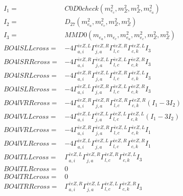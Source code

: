 \documentclass[A4,landscape]{article}
\begin{document}
\begin{align} 
I_1 = & C0D0check(m^2_{e_{{c}}}, m^2_{Z}, m^2_{Z}, m^2_{e_{{a}}}) \\ 
I_2 = & D_{27}(m^2_{e_{{a}}}, m^2_{e_{{c}}}, m^2_{Z}, m^2_{Z}) \\ 
I_3 = & MMD0(m_{e_{{a}}}, m_{e_{{c}}}, m^2_{e_{{a}}}, m^2_{e_{{c}}}, m^2_{Z}, m^2_{Z}) \\ 
  BO4lSLLcross= & -4  \Gamma^{\bar{e}e Z ,L}_{a, i} \Gamma^{\bar{e}e Z ,R}_{j, a} \Gamma^{\bar{e}e Z ,R}_{l, c} \Gamma^{\bar{e}e Z ,L}_{c, k} I_3 \\ 
  BO4lSRRcross= & -4  \Gamma^{\bar{e}e Z ,R}_{a, i} \Gamma^{\bar{e}e Z ,L}_{j, a} \Gamma^{\bar{e}e Z ,L}_{l, c} \Gamma^{\bar{e}e Z ,R}_{c, k} I_3 \\ 
  BO4lSRLcross= & -4  \Gamma^{\bar{e}e Z ,R}_{a, i} \Gamma^{\bar{e}e Z ,L}_{j, a} \Gamma^{\bar{e}e Z ,R}_{l, c} \Gamma^{\bar{e}e Z ,L}_{c, k} I_3 \\ 
  BO4lSLRcross= & -4  \Gamma^{\bar{e}e Z ,L}_{a, i} \Gamma^{\bar{e}e Z ,R}_{j, a} \Gamma^{\bar{e}e Z ,L}_{l, c} \Gamma^{\bar{e}e Z ,R}_{c, k} I_3 \\ 
  BO4lVRRcross= & -4  \Gamma^{\bar{e}e Z ,R}_{a, i} \Gamma^{\bar{e}e Z ,R}_{j, a} \Gamma^{\bar{e}e Z ,R}_{l, c} \Gamma^{\bar{e}e Z ,R}_{c, k} (I_1 - 3 I_2) \\ 
  BO4lVLLcross= & -4  \Gamma^{\bar{e}e Z ,L}_{a, i} \Gamma^{\bar{e}e Z ,L}_{j, a} \Gamma^{\bar{e}e Z ,L}_{l, c} \Gamma^{\bar{e}e Z ,L}_{c, k} (I_1 - 3 I_2) \\ 
  BO4lVRLcross= & -4  \Gamma^{\bar{e}e Z ,R}_{a, i} \Gamma^{\bar{e}e Z ,R}_{j, a} \Gamma^{\bar{e}e Z ,L}_{l, c} \Gamma^{\bar{e}e Z ,L}_{c, k} I_1 \\ 
  BO4lVLRcross= & -4  \Gamma^{\bar{e}e Z ,L}_{a, i} \Gamma^{\bar{e}e Z ,L}_{j, a} \Gamma^{\bar{e}e Z ,R}_{l, c} \Gamma^{\bar{e}e Z ,R}_{c, k} I_1 \\ 
  BO4lTLLcross= &  \Gamma^{\bar{e}e Z ,L}_{a, i} \Gamma^{\bar{e}e Z ,R}_{j, a} \Gamma^{\bar{e}e Z ,R}_{l, c} \Gamma^{\bar{e}e Z ,L}_{c, k} I_3 \\ 
  BO4lTLRcross= & 0 \\ 
  BO4lTRLcross= & 0 \\ 
  BO4lTRRcross= &  \Gamma^{\bar{e}e Z ,R}_{a, i} \Gamma^{\bar{e}e Z ,L}_{j, a} \Gamma^{\bar{e}e Z ,L}_{l, c} \Gamma^{\bar{e}e Z ,R}_{c, k} I_3 \\ 
\end{align} 
\end{document}

